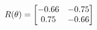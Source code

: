 \documentclass[preview]{standalone}
\begin{document}
\begin{align*}
\special{dvisvgm:raw <g id='unique000'>}R(\theta) = \begin{bmatrix}-0.66 & -0.75\\0.75 & -0.66\end{bmatrix}\special{dvisvgm:raw </g>}
\end{align*}
\end{document}
